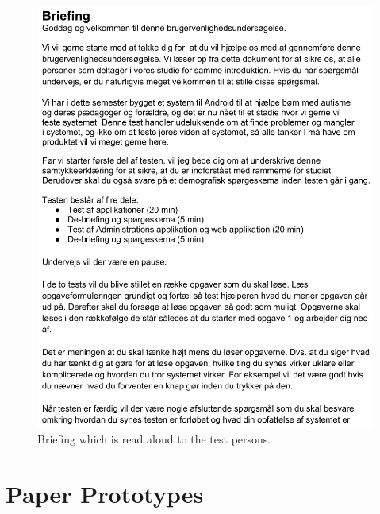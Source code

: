 	\begin{figure}[H]
		\begin{center}
			\includegraphics[width=\textwidth]{Appendix/usability-briefing.png}
		\end{center}
		\caption{Briefing which is read aloud to the test persons.}
		\label{appendice:usability_briefing}
	\end{figure}
	


	




\section{Paper Prototypes}
	\label{sec:paper_prot}

